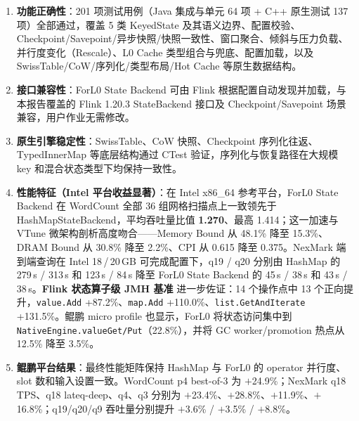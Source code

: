 \documentclass[a4paper,11pt]{article}
\newcommand{\project}{ForL0 State Backend}
\begin{document}
\small
\begin{enumerate}
  \item \textbf{功能正确性}：201 项测试用例（Java 集成与单元 64 项 + C++ 原生测试 137 项）全部通过，覆盖 5 类 KeyedState 及其语义边界、配置校验、Checkpoint/Savepoint/异步快照/快照一致性、窗口聚合、倾斜与压力负载、并行度变化（Rescale）、L0 Cache 类型组合与兜底、配置加载，以及 SwissTable/CoW/序列化/类型布局/Hot Cache 等原生数据结构。
  \item \textbf{接口兼容性}：\project{} 可由 Flink 根据配置自动发现并加载，与本报告覆盖的 Flink 1.20.3 StateBackend 接口及 Checkpoint/Savepoint 场景兼容，用户作业无需修改。
  \item \textbf{原生引擎稳定性}：SwissTable、CoW 快照、Checkpoint 序列化往返、TypedInnerMap 等底层结构通过 CTest 验证，序列化与恢复路径在大规模 key 和混合状态类型下均保持一致性。
  \item \textbf{性能特征（Intel 平台收益显著）}：在 Intel x86\_64 参考平台，\project{} 在 WordCount 全部 36 组网格扫描点上一致领先于 HashMapStateBackend，平均吞吐量比值 \textbf{1.270}、最高 1.414；这一加速与 VTune 微架构剖析高度吻合——Memory Bound 从 48.1\% 降至 15.3\%、DRAM Bound 从 30.8\% 降至 2.2\%、CPI 从 0.615 降至 0.375。NexMark 端到端查询在 Intel 18\,/\,20\,GB 可完成配置下，q19 / q20 分别由 HashMap 的 279\,s / 313\,s 和 123\,s / 84\,s 降至 \project{} 的 45\,s / 38\,s 和 43\,s / 38\,s。\textbf{Flink 状态算子级 JMH 基准} 进一步佐证：14 个操作点中 13 个正向提升，\texttt{value.Add} +87.2\%、\texttt{map.Add} +110.0\%、\texttt{list.GetAndIterate} +131.5\%。鲲鹏 micro profile 也显示，ForL0 将状态访问集中到 \texttt{NativeEngine.valueGet/Put}（22.8\%），并将 GC worker/promotion 热点从 12.5\% 降至 3.5\%。
  \item \textbf{鲲鹏平台结果}：最终性能矩阵保持 HashMap 与 ForL0 的 operator 并行度、slot 数和输入设置一致。WordCount p4 best-of-3 为 $+$24.9\%；NexMark q18 TPS、q18 lateq-deep、q4、q3 分别为 $+$23.4\%、$+$28.8\%、$+$11.9\%、$+$16.8\%；q19/q20/q9 吞吐量分别提升 $+$3.6\% / $+$3.5\% / $+$8.8\%。
\end{enumerate}
\end{document}
